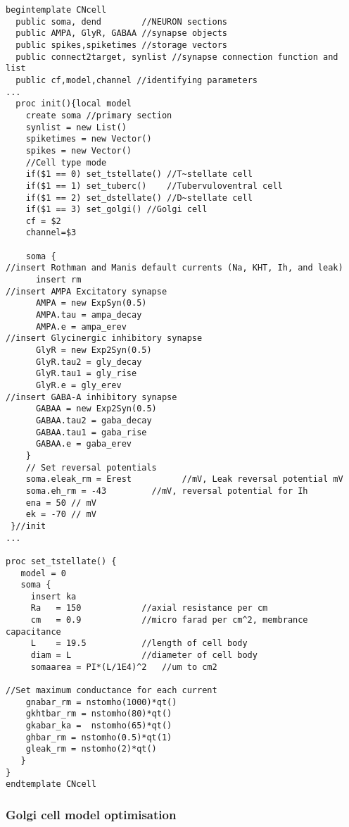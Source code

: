 \begin{lstlisting}[label=lst:CellTemplate,caption=Rothman and Manis cochlear nucleus cell template (in CNcell.tem)]
  begintemplate CNcell
  public soma, dend        //NEURON sections
  public AMPA, GlyR, GABAA //synapse objects
  public spikes,spiketimes //storage vectors
  public connect2target, synlist //synapse connection function and list
  public cf,model,channel //identifying parameters
...
  proc init(){local model
    create soma //primary section
    synlist = new List()
    spiketimes = new Vector()
    spikes = new Vector()
    //Cell type mode
    if($1 == 0) set_tstellate() //T~stellate cell
    if($1 == 1) set_tuberc()    //Tubervuloventral cell
    if($1 == 2) set_dstellate() //D~stellate cell
    if($1 == 3) set_golgi() //Golgi cell
    cf = $2
    channel=$3

    soma {
//insert Rothman and Manis default currents (Na, KHT, Ih, and leak)
      insert rm
//insert AMPA Excitatory synapse
      AMPA = new ExpSyn(0.5)
      AMPA.tau = ampa_decay
      AMPA.e = ampa_erev
//insert Glycinergic inhibitory synapse
      GlyR = new Exp2Syn(0.5)
      GlyR.tau2 = gly_decay
      GlyR.tau1 = gly_rise
      GlyR.e = gly_erev
//insert GABA-A inhibitory synapse
      GABAA = new Exp2Syn(0.5)
      GABAA.tau2 = gaba_decay
      GABAA.tau1 = gaba_rise
      GABAA.e = gaba_erev
    }
    // Set reversal potentials
    soma.eleak_rm = Erest          //mV, Leak reversal potential mV
    soma.eh_rm = -43         //mV, reversal potential for Ih
    ena = 50 // mV
    ek = -70 // mV
 }//init
...

proc set_tstellate() {
   model = 0
   soma {
     insert ka
     Ra   = 150            //axial resistance per cm
     cm   = 0.9            //micro farad per cm^2, membrance capacitance
     L    = 19.5           //length of cell body
     diam = L              //diameter of cell body
     somaarea = PI*(L/1E4)^2   //um to cm2

//Set maximum conductance for each current
	gnabar_rm = nstomho(1000)*qt()
	gkhtbar_rm = nstomho(80)*qt()
	gkabar_ka =  nstomho(65)*qt()
	ghbar_rm = nstomho(0.5)*qt(1)
	gleak_rm = nstomho(2)*qt()
   }
}
endtemplate CNcell

\end{lstlisting}



\subsubsection[Golgi model]{Golgi cell model
  optimisation    \label{sec:APDX:golgi-cell-model}}

